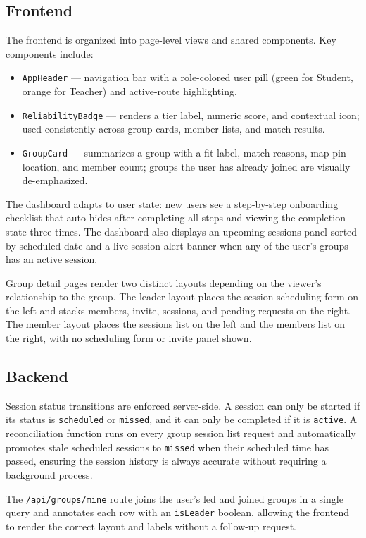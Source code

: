 \documentclass[conference]{IEEEtran}
\begin{document}
\subsection{Frontend}
The frontend is organized into page-level views and shared components. Key components include:
\begin{itemize}
    \item \texttt{AppHeader} --- navigation bar with a role-colored user pill (green for Student, orange for Teacher) and active-route highlighting.
    \item \texttt{ReliabilityBadge} --- renders a tier label, numeric score, and contextual icon; used consistently across group cards, member lists, and match results.
    \item \texttt{GroupCard} --- summarizes a group with a fit label, match reasons, map-pin location, and member count; groups the user has already joined are visually de-emphasized.
\end{itemize}

The dashboard adapts to user state: new users see a step-by-step onboarding checklist that auto-hides after completing all steps and viewing the completion state three times. The dashboard also displays an upcoming sessions panel sorted by scheduled date and a live-session alert banner when any of the user's groups has an active session.

Group detail pages render two distinct layouts depending on the viewer's relationship to the group. The leader layout places the session scheduling form on the left and stacks members, invite, sessions, and pending requests on the right. The member layout places the sessions list on the left and the members list on the right, with no scheduling form or invite panel shown.

\subsection{Backend}
Session status transitions are enforced server-side. A session can only be started if its status is \texttt{scheduled} or \texttt{missed}, and it can only be completed if it is \texttt{active}. A reconciliation function runs on every group session list request and automatically promotes stale scheduled sessions to \texttt{missed} when their scheduled time has passed, ensuring the session history is always accurate without requiring a background process.

The \texttt{/api/groups/mine} route joins the user's led and joined groups in a single query and annotates each row with an \texttt{isLeader} boolean, allowing the frontend to render the correct layout and labels without a follow-up request.
\end{document}
